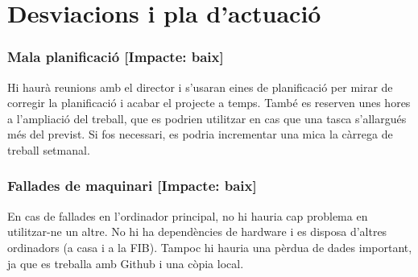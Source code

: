 \section{Desviacions i pla d'actuació}
	\subsubsection{Mala planificació [Impacte: baix]}
		Hi haurà reunions amb el director i s'usaran eines de planificació per mirar de corregir la planificació i acabar el projecte a temps. També es reserven unes hores a l'ampliació del treball,
		que es podrien utilitzar en cas que una tasca s'allargués més del previst. Si fos necessari, es podria incrementar una mica la càrrega de treball setmanal.
	\subsubsection{Fallades de maquinari [Impacte: baix]}
		En cas de fallades en l'ordinador principal, no hi hauria cap problema en utilitzar-ne un altre. No hi ha dependències de hardware i es disposa d'altres ordinadors (a casa i a la FIB).
		Tampoc hi hauria una pèrdua de dades important, ja que es treballa amb Github i una còpia local.
